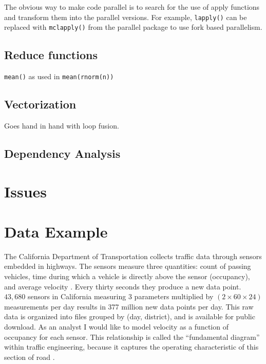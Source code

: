 \documentclass[12pt]{article}
\begin{document}
The obvious way to make code parallel is to search for the use of
apply functions and transform them into the parallel versions. For example, 
\texttt{lapply()} can be replaced with \texttt{mclapply()} from the
parallel package to use fork based parallelism.

\subsection{Reduce functions}

\texttt{mean()} as used in \texttt{mean(rnorm(n))} 

\subsection{Vectorization}

Goes hand in hand with loop fusion.

\subsection{Dependency Analysis}

\section{Issues}


\section{Data Example}

The California Department of Transportation collects traffic data through
sensors embedded in highways. The sensors measure three quantities: count
of passing vehicles, time during which a vehicle is directly above the
sensor (occupancy), and average velocity \cite{jia2001pems}.  Every thirty
seconds they produce a new data point. $43,680$ sensors in California
measuring 3 parameters multiplied by $(2 \times 60 \times 24)$ measurements
per day results in 377 million new data points per day.  This raw data is
organized into files grouped by (day, district), and is available for
public download.  As an analyst I would like to model velocity as a
function of occupancy for each sensor. This relationship is called the
``fundamental diagram'' within traffic engineering, because it captures the
operating characteristic of this section of road
\cite{daganzo1997fundamentals}.
\end{document}
